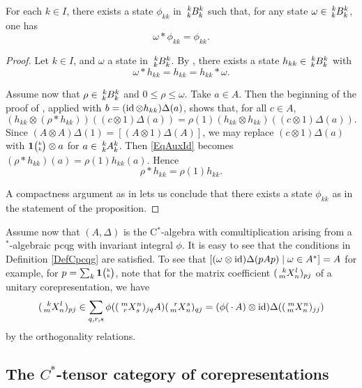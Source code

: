 \begin{Prop} For each $k\in I$, there exists a state $\phi_{kk}$ in $\Gr{B}{k}{k}{k}{k}$ such that, for any state $\omega \in \Gr{B}{k}{k}{k}{k}$, one has \[\omega*\phi_{kk} =\phi_{kk}.\]
\end{Prop} 
\begin{proof} Let $k\in I$, and $\omega$ a state in $\Gr{B}{k}{k}{k}{k}$. By \cite[Lemma 4.2]{MVD1},
  there exists a state $h_{kk} \in \Gr{B}{k}{k}{k}{k}$ with \[\omega *h_{kk}= h_{kk} =
  h_{kk}*\omega.\]

  Assume now that $\rho\in \Gr{B}{k}{k}{k}{k}$ and $0\leq \rho\leq \omega$. Take $a\in A$. Then the
  beginning of the proof of \cite[Lemma 4.3]{MVD1}, applied with $b= (\operatorname{id}\otimes h_{kk})\Delta(a)$,
  shows that, for all $c\in A$, 
  \begin{equation}\label{EqAuxId} (h_{kk}\otimes
    (\rho*h_{kk}))((c\otimes 1)\Delta(a)) = \rho(1) (h_{kk}\otimes h_{kk})((c\otimes
    1)\Delta(a)).\end{equation} 
Since $(A\otimes A)\Delta(1) = [(A\otimes 1)\Delta(A)]$, we may
  replace $(c\otimes 1)\Delta(a)$ with $\mathbf{1}{\tiny {\begin{pmatrix} k\\k\end{pmatrix}}}\otimes a$ for $a\in \Gr{A}{k}{k}{k}{k}$. Then
  \eqref{EqAuxId} becomes $(\rho*h_{kk})(a) = \rho(1)h_{kk}(a)$. Hence \[\rho*h_{kk} =
  \rho(1)h_{kk}.\]

A compactness argument as in \cite[Theorem 4.4]{MVD1} lets us conclude that there exists a state $\phi_{kk}$ as in the statement of the proposition.
\end{proof}


  Assume now that $(A,\Delta)$ is the C$^*$-algebra with comultiplication arising from a $^*$-algebraic pcqg with invariant integral $\phi$. It is easy to see that the conditions in Definition \ref{DefCpcqg} are satisfied. To see that $[(\omega\otimes \operatorname{id})\Delta(pAp)\mid \omega \in A^*] = A$ for example, for $p = \sum_{k} \mathbf{1}{\tiny {\begin{pmatrix} k\\k\end{pmatrix}}}$, note that for the matrix coefficient $(\Gr{X}{k}{l}{m}{n})_{pj}$ of a unitary corepresentation, we have \[ (\Gr{X}{k}{l}{m}{n})_{pj} \in \sum_{q,r,s} \phi((\Gr{X}{m}{n}{r}{s})_{jq}A) (\Gr{X}{r}{s}{m}{n})_{qj} =(\phi(\,\cdot\, A)\otimes \id)\Delta((\Gr{X}{m}{n}{m}{n})_{jj})\] by the orthogonality relations. 




\subsection{The $C^{*}$-tensor category of corepresentations}

